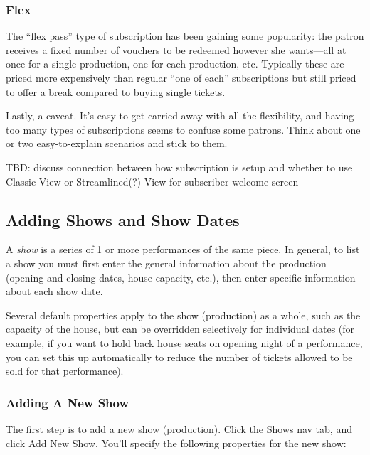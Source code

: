 \subsubsection{Flex}

The ``flex pass'' type of subscription has been gaining some popularity:
the patron receives a fixed number of vouchers to be redeemed however
she wants---all at once for a single production, one for each
production, etc.  Typically these are priced more expensively than
regular ``one of each'' subscriptions but still priced to offer a break
compared to buying single tickets.

Lastly, a caveat.  It's easy to get carried away with all the
flexibility, and having too many types of subscriptions seems to confuse
some patrons.  Think about one or two easy-to-explain scenarios and
stick to them.

TBD: discuss connection between how subscription is setup and whether to
use Classic View or Streamlined(?) View for subscriber welcome screen

\subsection{Adding Shows and Show Dates}
\label{sec:shows-and-showdates}

A \emph{show} is a series of 1 or more performances of the same piece.
In general, to list a show you must first enter the general information
about the production (opening and closing dates, house capacity, etc.),
then enter specific information about each show date.

Several default properties apply to the show (production) as a whole,
such as the capacity of the house, but can be overridden selectively for
individual dates (for example, if you want to hold back house seats on
opening night of a performance, you can set this up automatically to
reduce the number of tickets allowed to be sold for that performance).

\subsubsection{Adding A New Show}
\label{sec:addingshows}

The first step is to add a new show (production).  Click the Shows nav
tab, and click Add New Show.  You'll specify the following properties
for the new show:

